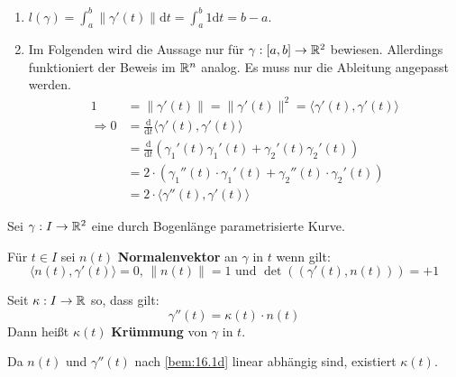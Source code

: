 \begin{beweis}\leavevmode
    \begin{enumerate}[label=\alph*)]
        \item $l(\gamma) = \int_a^b \|\gamma'(t)\| \mathrm{d} t = \int_a^b 1 \mathrm{d} t = b - a$.
        \item Im Folgenden wird die Aussage nur für $\gamma: [a, b] \rightarrow \mathbb{R}^2$ bewiesen.
              Allerdings funktioniert der Beweis im $\mathbb{R}^n$ analog. Es muss nur
              die Ableitung angepasst werden.
              \begin{align*}
                            1 &= \|\gamma'(t)\| = \|\gamma'(t)\|^2 = \langle \gamma'(t), \gamma'(t) \rangle\\
                \Rightarrow 0 &= \frac{\mathrm{d}}{\mathrm{d}t} \langle \gamma'(t), \gamma'(t) \rangle\\
                              &= \frac{\mathrm{d}}{\mathrm{d}t} (\gamma_1'(t)\gamma_1'(t) + \gamma_2'(t)\gamma_2'(t))\\
                              &= 2 \cdot (\gamma_1''(t) \cdot \gamma_1'(t) + \gamma_2''(t) \cdot \gamma_2'(t))\\
                              &= 2 \cdot \langle \gamma''(t), \gamma'(t) \rangle
              \end{align*}
    \end{enumerate}
\end{beweis}

\begin{definition}%
    Sei $\gamma: I \rightarrow \mathbb{R}^2$ eine durch Bogenlänge
    parametrisierte Kurve.

    \begin{defenum}
        \item Für $t \in I$ sei $n(t)$ \textbf{Normalenvektor}
              an $\gamma$ in $t$ wenn gilt:
              \[\langle n(t), \gamma'(t) \rangle = 0 \text{, } \|n(t)\|=1 \text{ und } \det((\gamma'(t), n(t))) = +1\]
        \item Seit $\kappa: I \rightarrow \mathbb{R}$ so, dass gilt:
              \[\gamma''(t) = \kappa(t) \cdot n(t)\]
              Dann heißt $\kappa(t)$ \textbf{Krümmung}
              von $\gamma$ in $t$.
    \end{defenum}
\end{definition}

Da $n(t)$ und $\gamma''(t)$ nach \cref{bem:16.1d} linear
              abhängig sind, existiert $\kappa(t)$.

